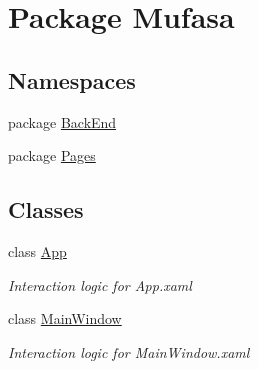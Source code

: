 \hypertarget{namespace_mufasa}{\section{Package Mufasa}
\label{namespace_mufasa}
}
\subsection*{Namespaces}
\begin{DoxyCompactItemize}
\item 
package \hyperlink{namespace_mufasa_1_1_back_end}{Back\+End}
\item 
package \hyperlink{namespace_mufasa_1_1_pages}{Pages}
\end{DoxyCompactItemize}
\subsection*{Classes}
\begin{DoxyCompactItemize}
\item 
class \hyperlink{class_mufasa_1_1_app}{App}
\begin{DoxyCompactList}\small\item\em Interaction logic for App.\+xaml \end{DoxyCompactList}\item 
class \hyperlink{class_mufasa_1_1_main_window}{Main\+Window}
\begin{DoxyCompactList}\small\item\em Interaction logic for Main\+Window.\+xaml \end{DoxyCompactList}\end{DoxyCompactItemize}
